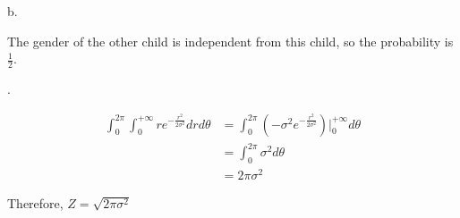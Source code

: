 \documentclass[UTF8]{article}
\begin{document}
\noindent b.

The gender of the other child is independent from this child, so the probability is $\frac{1}{2}$.

.

\begin{align*}
    \int_{0}^{2\pi}\int_{0}^{+\infty}re^{-\frac{r^2}{2\sigma^2}}drd\theta&=\int_{0}^{2\pi}(-\sigma^2e^{-\frac{r^2}{2\sigma^2}})|_{0}^{+\infty}d\theta\\
    &=\int_{0}^{2\pi}\sigma^2d\theta\\
    &=2\pi\sigma^2
\end{align*}

Therefore, $Z=\sqrt{2\pi\sigma^2}$
\end{document}
